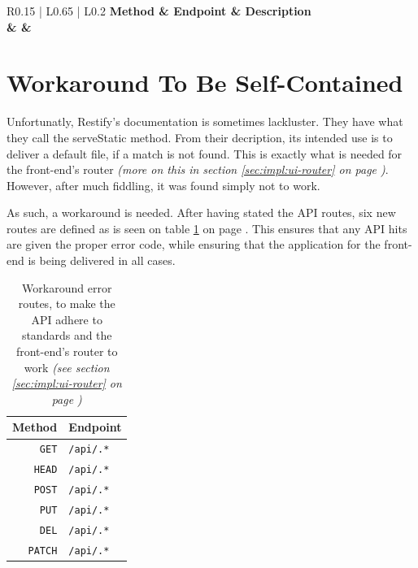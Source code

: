 		\begin{table}[p]
			
			\begin{tabularx}{\textwidth}{ R{0.15} | L{0.65} | L{0.2} }
				\bfseries Method & \bfseries Endpoint & \bfseries Description%
				{\\\hline\method & \texttt{\endpoint} & \description}%
			\end{tabularx}

			\caption{API endpoints for the Auth resource.}
			\label{tab:api:auth}
		\end{table}

	\section{Workaround To Be Self-Contained}
		Unfortunatly, Restify's documentation is sometimes lackluster. They have what they call the serveStatic method. From their decription, its intended use is to deliver a default file, if a match is not found. This is exactly what is needed for the front-end's router \emph{(more on this in section \ref{sec:impl:ui-router} on page \pageref{sec:impl:ui-router})}. However, after much fiddling, it was found simply not to work.

		As such, a workaround is needed. After having stated the API routes, six new routes are defined as is seen on table \ref{tab:api:workaround} on page \pageref{tab:api:workaround}. This ensures that any API hits are given the proper error code, while ensuring that the application for the front-end is being delivered in all cases.
		\begin{table}
			\centering
			\begin{tabular}{r | l}
				\textbf{Method} & \textbf{Endpoint} \\
				\hline
				\verb=GET=		& \verb=/api/.*= \\
				\verb=HEAD=		& \verb=/api/.*= \\	
				\verb=POST=		& \verb=/api/.*= \\	
				\verb=PUT=		& \verb=/api/.*= \\
				\verb=DEL=		& \verb=/api/.*= \\
				\verb=PATCH=	& \verb=/api/.*= \\	
			\end{tabular}
			\caption{Workaround error routes, to make the API adhere to standards and the front-end's router to work \emph{(see section \ref{sec:impl:ui-router} on page \pageref{sec:impl:ui-router})}}
			\label{tab:api:workaround}
		\end{table}

